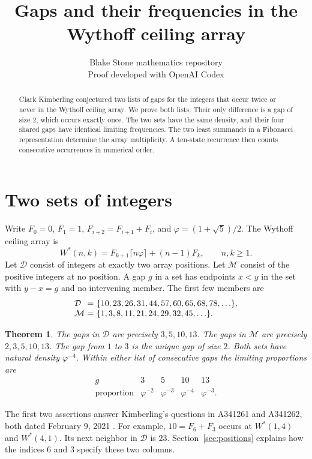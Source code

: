 \documentclass[11pt]{article}
\title{Gaps and their frequencies in the Wythoff ceiling array}
\author{Blake Stone mathematics repository\\[-2pt]\small Proof developed with OpenAI Codex}
\date{}
\newtheorem{theorem}{Theorem}
\newcommand{\D}{\mathcal D}
\newcommand{\M}{\mathcal M}
\newcommand{\ph}{\varphi}
\begin{document}
\maketitle
\begin{abstract}
Clark Kimberling conjectured two lists of gaps for the integers that occur
twice or never in the Wythoff ceiling array. We prove both lists. Their only
difference is a gap of size $2$, which occurs exactly once. The two sets have
the same density, and their four shared gaps have identical limiting
frequencies. The two least summands in a Fibonacci representation determine
the array multiplicity. A ten-state recurrence then counts consecutive
occurrences in numerical order.
\end{abstract}

\section{Two sets of integers}
Write $F_0=0$, $F_1=1$, $F_{i+2}=F_{i+1}+F_i$, and
$\ph=(1+\sqrt5)/2$. The Wythoff ceiling array \cite{array} is
\[
 W^*(n,k)=F_{k+1}\lceil n\ph\rceil+(n-1)F_k,\qquad n,k\ge1 .
\]
Let $\D$ consist of integers at exactly two array positions. Let $\M$ consist
of the positive integers at no position. A gap $g$ in a set has endpoints
$x<y$ in the set with $y-x=g$ and no intervening member. The first few
members are
\[
\begin{array}{l@{\ =\ }l}
\D & \{10,23,26,31,44,57,60,65,68,78,\ldots\},\\
\M & \{1,3,8,11,21,24,29,32,45,\ldots\}.
\end{array}
\]

\begin{theorem}\label{main}
The gaps in $\D$ are precisely $3,5,10,13$. The gaps in $\M$ are precisely
$2,3,5,10,13$. The gap from $1$ to $3$ is the unique gap of size $2$.
Both sets have natural density $\ph^{-4}$. Within either list of consecutive
gaps the limiting proportions are
\[
\begin{array}{c|cccc}
g&3&5&10&13\\ \hline
\text{proportion}&\ph^{-2}&\ph^{-3}&\ph^{-4}&\ph^{-3}.
\end{array}
\]
\end{theorem}
The first two assertions answer Kimberling's questions in A341261 and
A341262, both dated February 9, 2021 \cite{twice,missing}.
For example, $10=F_6+F_3$ occurs at $W^*(1,4)$ and $W^*(4,1)$.
Its next neighbor in $\D$ is $23$. Section~\ref{sec:positions} explains
how the indices $6$ and $3$ specify these two columns.
\end{document}
